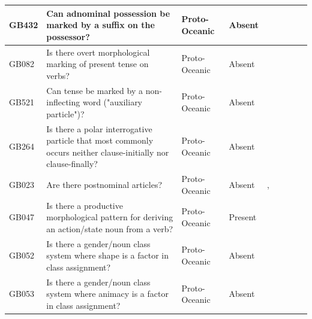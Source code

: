 \documentclass[draft,10pt]{article} %
\begin{document}
\begin{landscape}
\begin{longtable}{| p{2cm}| p{3cm}| p{2.5cm}|p{2cm}|p{2cm}|p{2cm}|p{2cm}|p{2cm}|p{2cm}|}
GB432&Can adnominal possession be marked by a suffix on the possessor?&Proto-Oceanic&Absent&\citet[498]{ross2004morphosyntactic}& \cellcolor{hedvig_lightgreen!50}{True Negative} & \cellcolor{hedvig_yellow!50}{Half} & \cellcolor{hedvig_yellow!50}{True Negative} & \cellcolor{hedvig_yellow!50}{Half} \\ \hline
GB082&Is there overt morphological marking of present tense on verbs?&Proto-Oceanic&Absent&\citet[84]{lynchrosscrowley_proto_grammar_oceanic}& \cellcolor{hedvig_lightgreen!50}{True Negative} & \cellcolor{hedvig_yellow!50}{Half} & \cellcolor{hedvig_yellow!50}{True Negative} & \cellcolor{hedvig_yellow!50}{Half} \\ \hline
GB521&Can tense be marked by a non-inflecting word ("auxiliary particle")?&Proto-Oceanic&Absent&\citet[84]{lynchrosscrowley_proto_grammar_oceanic}& \cellcolor{hedvig_lightgreen!50}{True Negative} & \cellcolor{hedvig_yellow!50}{Half} & \cellcolor{hedvig_yellow!50}{True Negative} & \cellcolor{hedvig_yellow!50}{Half} \\ \hline
GB264&Is there a polar interrogative particle that most commonly occurs neither clause-initially nor clause-finally?&Proto-Oceanic&Absent&\citet[89]{lynchrosscrowley_proto_grammar_oceanic}& \cellcolor{hedvig_lightgreen!50}{True Negative} & \cellcolor{hedvig_yellow!50}{Half} & \cellcolor{hedvig_yellow!50}{True Negative} & \cellcolor{hedvig_yellow!50}{Half} \\ \hline
GB023&Are there postnominal articles?&Proto-Oceanic&Absent&\citet[112]{pawley1973some}, \citet[498]{ross2004morphosyntactic}& \cellcolor{hedvig_lightgreen!50}{True Negative} & \cellcolor{hedvig_yellow!50}{Half} & \cellcolor{hedvig_yellow!50}{True Negative} & \cellcolor{hedvig_yellow!50}{Half} \\ \hline
GB047&Is there a productive morphological pattern for deriving an action/state noun from a verb?&Proto-Oceanic&Present&\citet[70]{lynchrosscrowley_proto_grammar_oceanic}& \cellcolor{hedvig_lightgreen!50}{True Positive} & \cellcolor{hedvig_yellow!50}{Half} & \cellcolor{hedvig_lightgreen!50}{True Positive} & \cellcolor{hedvig_yellow!50}{Half} \\ \hline
GB052&Is there a gender/noun class system where shape is a factor in class assignment?&Proto-Oceanic&Absent&\citet[498]{ross2004morphosyntactic}& \cellcolor{hedvig_lightgreen!50}{True Negative} & \cellcolor{hedvig_yellow!50}{Half} & \cellcolor{hedvig_yellow!50}{True Negative} & \cellcolor{hedvig_yellow!50}{Half} \\ \hline
GB053&Is there a gender/noun class system where animacy is a factor in class assignment?&Proto-Oceanic&Absent&\citet[498]{ross2004morphosyntactic}& \cellcolor{hedvig_lightgreen!50}{True Negative} & \cellcolor{hedvig_yellow!50}{Half} & \cellcolor{hedvig_yellow!50}{True Negative} & \cellcolor{hedvig_yellow!50}{Half} \\ \hline

\end{longtable}
\end{landscape}
\end{document}
